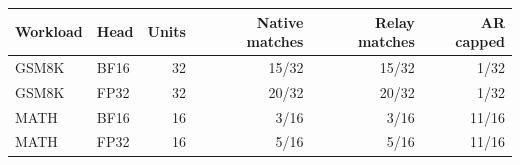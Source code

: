 \begin{tabular}{llrrrr}
\toprule
Workload & Head & Units & Native matches & Relay matches & AR capped \\
\midrule
GSM8K & BF16 & 32 & 15/32 & 15/32 & 1/32 \\
GSM8K & FP32 & 32 & 20/32 & 20/32 & 1/32 \\
MATH & BF16 & 16 & 3/16 & 3/16 & 11/16 \\
MATH & FP32 & 16 & 5/16 & 5/16 & 11/16 \\
\bottomrule
\end{tabular}
